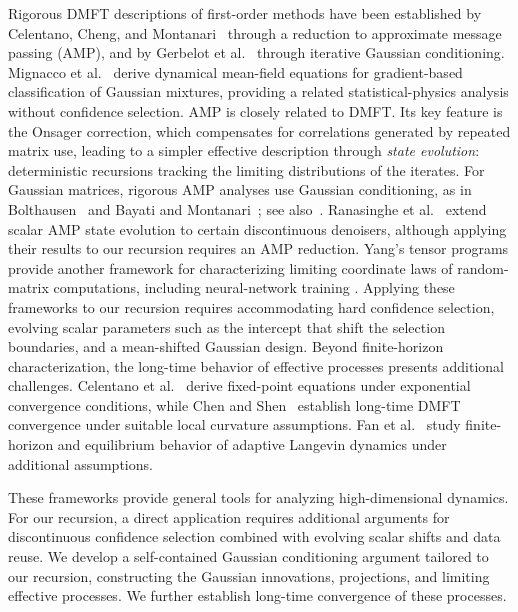 Rigorous DMFT descriptions of first-order methods have
been established by Celentano, Cheng, and
Montanari~\cite{celentano2026highdimensionalasymptoticsordermethods}
through a reduction to approximate message passing (AMP),
and by Gerbelot et al.~\cite{gerbelot2024rigorous}
through iterative Gaussian conditioning.
Mignacco et al.~\cite{Mignacco_2021} derive dynamical
mean-field equations for gradient-based classification
of Gaussian mixtures, providing a related statistical-physics
analysis without confidence selection.
AMP is closely related to DMFT.
Its key feature is the Onsager correction, which compensates
for correlations generated by repeated matrix use,
leading to a simpler effective description through
\emph{state evolution}: deterministic recursions tracking
the limiting distributions of the iterates.
For Gaussian matrices, rigorous AMP analyses use Gaussian
conditioning, as in Bolthausen~\cite{bolthausen2009}
and Bayati and Montanari~\cite{bayati2011dynamics};
see also~\cite{feng2022unifying}.
Ranasinghe et al.~\cite{ranasinghe2026state} extend scalar
AMP state evolution to certain discontinuous denoisers, although applying
their results to our recursion requires an AMP reduction.
Yang's tensor programs provide another framework for
characterizing limiting coordinate laws of random-matrix
computations, including neural-network training
\cite{yang2020neuralmatrixlaws,yang2022}.
Applying these frameworks to our recursion requires accommodating 
hard confidence selection, evolving scalar parameters such as the 
intercept that shift the selection boundaries, 
and a mean-shifted Gaussian design.
Beyond finite-horizon characterization, the long-time
behavior of effective processes presents additional challenges.
Celentano et
al.~\cite{celentano2026highdimensionalasymptoticsordermethods}
derive fixed-point equations under exponential convergence
conditions, while Chen and
Shen~\cite{chen2025learningsingleindexmodel}
establish long-time DMFT convergence under suitable local
curvature assumptions.
Fan et al.~\cite{fan2025dynamicalmeanfieldanalysisadaptivepropagation,
fan2025dynamicalmeanfieldanalysisadaptivereplica}
study finite-horizon and equilibrium behavior of adaptive
Langevin dynamics under additional assumptions.

These frameworks provide general tools for analyzing
high-dimensional dynamics.
For our recursion, a direct application requires additional
arguments for discontinuous confidence selection combined
with evolving scalar shifts and data reuse.
We develop a self-contained Gaussian conditioning
argument tailored to our recursion, constructing the Gaussian
innovations, projections, and limiting effective processes.
We further establish long-time convergence of these processes.
